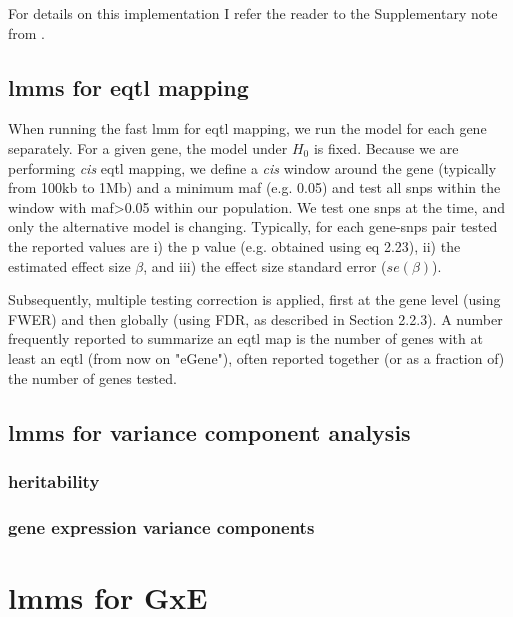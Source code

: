 For details on this implementation I refer the reader to the Supplementary note from \cite{lippert2011fast}.

\subsection{\gls{lmm}s for \gls{eqtl} mapping}

When running the fast \gls{lmm} for e\gls{qtl} mapping, we run the model for each gene separately.
For a given gene, the model under $H_0$ is fixed.
Because we are performing \textit{cis} \gls{eqtl} mapping, we define a \textit{cis} window around the gene (typically from 100kb to 1Mb) and a minimum \gls{maf} (e.g. 0.05) and test all \gls{snps} within the window with \gls{maf}>0.05 within our population.  
We test one \gls{snps} at the time, and only the alternative model is changing.
Typically, for each gene-\gls{snps} pair tested the reported values are i) the p value (e.g. obtained using eq 2.23), ii) the estimated effect size $\beta$, and iii) the effect size standard error ($se(\beta)$).


Subsequently, multiple testing correction is applied, first at the gene level (using FWER) and then globally (using FDR, as described in Section 2.2.3).
A number frequently reported to summarize an e\gls{qtl} map is the number of genes with at least an e\gls{qtl} (from now on "eGene"), often reported together (or as a fraction of) the number of genes tested.

\subsection{\gls{lmm}s for variance component analysis}

\subsubsection{heritability}

\subsubsection{gene expression variance components}

\newpage 


\section{\gls{lmm}s for GxE}

